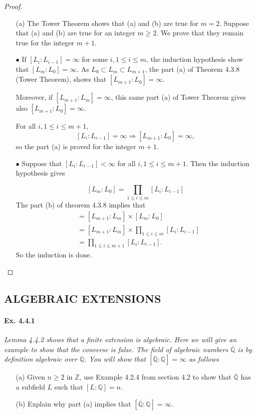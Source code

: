 \documentclass[11pt,a4paper]{article}
\newcommand{\Q}{\mathbb{Q}}
\newcommand{\Z}{\mathbb{Z}}
\begin{document}
\begin{proof}
\begin{enumerate}
\item[(a)]
The Tower Theorem shows that (a) and (b) are true for $m=2$. Suppose that (a) and (b) are true for an integer $m\geq 2$. We prove that they remain true for the integer $m+1$.

$\bullet$  If  $[L_i : L_{i-1}] = \infty$ for some $i, 1 \leq i \leq m$, the induction hypothesis show that $[L_m : L_0] = \infty$. As  $L_0 \subset L_m \subset L_{m+1}$, the part (a) of Theorem 4.3.8 (Tower Theorem), shows that $[L_{m+1} : L_0] = \infty$.

Moreover, if $[L_{m+1} : L_{m}] = \infty$, this same part (a) of Tower Theorem gives also $[L_{m+1} : L_0] = \infty$.

For all $i, 1 \leq i \leq m+1$,  $$[L_i : L_{i-1}] = \infty \Rightarrow [L_{m+1} : L_0] = \infty,$$  so the part (a) is proved for the integer $m+1$.

$\bullet$ Suppose that $[L_i : L_{i-1}] < \infty$ for all $i, 1\leq i \leq m+1$.
Then the induction hypothesis gives 

$$[L_m : L_0] = \prod_{1\leq i \leq m} [L_i : L_{i-1}]$$
The part (b) of theorem 4.3.8 implies that
\begin{align*}
 [L_{m+1}:L_0] &=  [L_{m+1}:L_{m}] \times  [L_{m}:L_0] \\
 &=  [L_{m+1}:L_{m}] \times \prod_{1\leq i \leq m} [L_i : L_{i-1}] \\
 &=  \prod_{1\leq i \leq m+1} [L_i : L_{i-1}].
 \end{align*}
So the induction is done.
\end{enumerate}
\end{proof}

\subsection{ALGEBRAIC EXTENSIONS}

\paragraph{Ex. 4.4.1}

{\it Lemma 4.4.2 shows that a finite extension is algebraic. Here we will give an example to show that the converse is false. The field of algebraic numbers $\overline{\Q}$ is by definition algebraic over $\Q$. You will show that $[\overline{\Q} : \Q] = \infty$ as follows
\begin{enumerate}
\item[(a)] Given $n\geq 2$ in $\Z$, use Example 4.2.4 from section 4.2 to show that $\overline{\Q}$ has a subfield $L$ such that $[L:\Q] = n$.
\item[(b)] Explain why part (a) implies that $[\overline{\Q} : \Q] = \infty$.
\end{enumerate}
}
\end{document}
